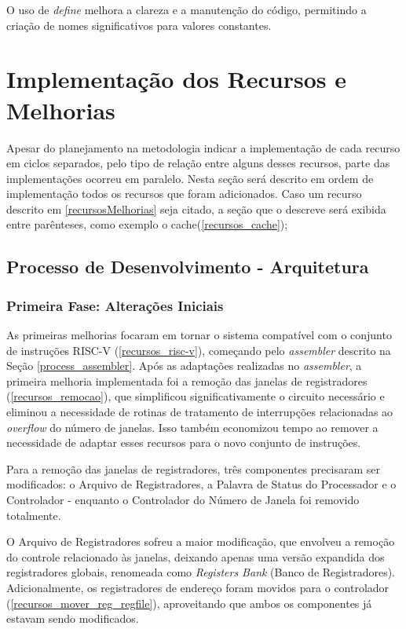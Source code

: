 \documentclass[
	12pt,				%
	openright,			%
	oneside,			%
	a4paper,			%
	english,			%
	french,				%
	spanish,			%
	brazil,				%
	]{abntex2}
\begin{document}
O uso de \textit{define} melhora a clareza e a manutenção do código, permitindo a criação de nomes significativos para valores constantes.

\section{Implementação dos Recursos e Melhorias}

Apesar do planejamento na metodologia indicar a implementação de cada recurso em ciclos separados, pelo tipo de relação entre alguns desses recursos, parte das implementações ocorreu em paralelo. Nesta seção será descrito em ordem de implementação todos os recursos que foram adicionados. Caso um recurso descrito em \ref{recursosMelhorias} seja citado, a seção que o descreve será exibida entre parênteses, como exemplo o cache(\ref{recursos_cache});

\subsection{Processo de Desenvolvimento - Arquitetura}

\subsubsection{Primeira Fase: Alterações Iniciais}

As primeiras melhorias focaram em tornar o sistema compatível com o conjunto de instruções RISC-V (\ref{recursos_risc-v}), começando pelo \textit{assembler} descrito na Seção \ref{process_assembler}. Após as adaptações realizadas no \textit{assembler}, a primeira melhoria implementada foi a remoção das janelas de registradores (\ref{recursos_remocao}), que simplificou significativamente o circuito necessário e eliminou a necessidade de rotinas de tratamento de interrupções relacionadas ao \textit{overflow} do número de janelas. Isso também economizou tempo ao remover a necessidade de adaptar esses recursos para o novo conjunto de instruções.

Para a remoção das janelas de registradores, três componentes precisaram ser modificados: o Arquivo de Registradores, a Palavra de Status do Processador e o Controlador - enquanto o Controlador do Número de Janela foi removido totalmente.

O Arquivo de Registradores sofreu a maior modificação, que envolveu a remoção do controle relacionado às janelas, deixando apenas uma versão expandida dos registradores globais, renomeada como \textit{Registers Bank} (Banco de Registradores). Adicionalmente, os registradores de endereço foram movidos para o controlador (\ref{recursos_mover_reg_regfile}), aproveitando que ambos os componentes já estavam sendo modificados.
\end{document}
